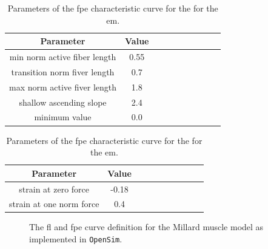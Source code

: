 \documentclass[11pt,a4paper,draft=false]{report}
\begin{document}
\begin{table}
  \centering
  \parbox{.45\linewidth}{
    \centering
    \caption{Parameters of the \gls{fl} characteristic curve for the
      \gls{em}.}\label{tab:fl-curve}
    \begin{tabular}{@{}cccccccccc@{}}
      \toprule
      \textbf{Parameter} & \textbf{Value} \\
      \midrule
      min norm active fiber length & 0.55 \\
      transition norm fiver length & 0.7 \\
      max norm active fiver length & 1.8 \\
      shallow ascending slope &  2.4 \\
      minimum value & 0.0 \\
      \bottomrule
    \end{tabular}
  }
  \quad
  \parbox{.45\linewidth}{
    \vspace{-1.5cm}
    \centering
    \caption{Parameters of the \gls{fpe} characteristic curve for the for the
      \gls{em}.}\label{tab:fpe-curve}
    \begin{tabular}{@{}cccccccccc@{}}
      \toprule
      \textbf{Parameter} & \textbf{Value} \\
      \midrule
      strain at zero force & -0.18 \\
      strain at one norm force & 0.4 \\
      \bottomrule
    \end{tabular}
  }
\end{table}

\begin{figure}[ht]
  \centering
  \caption{The \gls{fl} and \gls{fpe} curve definition for the Millard muscle
    model as implemented in \texttt{OpenSim}.}\label{fig:millard-curves}
\end{figure}
\end{document}
